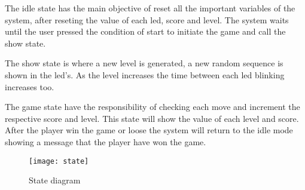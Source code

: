 \noindent
The idle state has the main objective of reset all the important variables of the system, after reseting the value of each led, score and level. 
The system waits until the user pressed the condition of start to initiate the game and call the show state.

\noindent
The show state is where a new level is generated, a new random sequence is shown in the led's.
As the level increases the time between each led blinking increases too. 

\noindent
The game state have the responsibility of checking each move and increment the respective score and level. This state will show the value of each level and score. After the player win the game or loose the system will return to the idle mode showing a message that the 
player have won the game.

\begin{figure}[!htbp]
    \centerline{\texttt{[image: state]}}
    \vspace{0cm}\caption{State diagram}
    \label{fig:state}
\end{figure}
